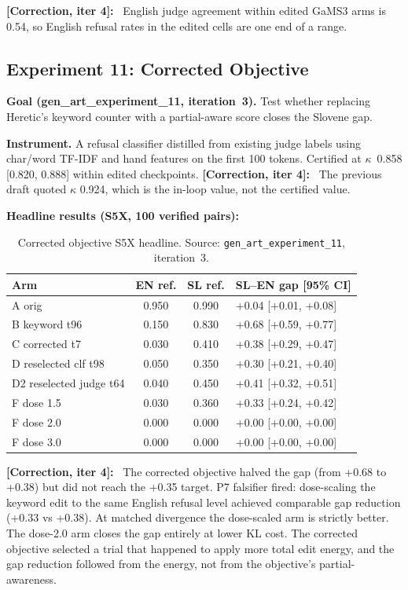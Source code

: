 \documentclass[11pt,letterpaper]{article}
\newcommand{\corr}[1]{\noindent\textbf{[Correction, iter #1]:}~}
\begin{document}
\corr{4} English judge agreement within edited GaMS3 arms is 0.54, so English refusal rates in the edited cells are one end of a range.


\subsection{Experiment 11: Corrected Objective}\label{sec:exp11}

\textbf{Goal (gen\_art\_experiment\_11, iteration~3).} Test whether replacing Heretic's keyword counter with a partial-aware score closes the Slovene gap.

\textbf{Instrument.} A refusal classifier distilled from existing judge labels using char/word TF-IDF and hand features on the first 100 tokens. Certified at $\kappa$~0.858 [0.820, 0.888] within edited checkpoints. \corr{4} The previous draft quoted $\kappa$ 0.924, which is the in-loop value, not the certified value.

\textbf{Headline results (S5X, 100 verified pairs):}

\begin{table}[!htbp]
\centering
\caption{Corrected objective S5X headline. Source: \texttt{gen\_art\_experiment\_11}, iteration~3.}
\label{tab:exp11_headline}
\small
\begin{tabular}{lccl}
\toprule
Arm & EN ref. & SL ref. & SL--EN gap [95\% CI] \\
\midrule
A orig & 0.950 & 0.990 & +0.04 [+0.01, +0.08] \\
B keyword t96 & 0.150 & 0.830 & +0.68 [+0.59, +0.77] \\
C corrected t7 & 0.030 & 0.410 & +0.38 [+0.29, +0.47] \\
D reselected clf t98 & 0.050 & 0.350 & +0.30 [+0.21, +0.40] \\
D2 reselected judge t64 & 0.040 & 0.450 & +0.41 [+0.32, +0.51] \\
F dose 1.5 & 0.030 & 0.360 & +0.33 [+0.24, +0.42] \\
F dose 2.0 & 0.000 & 0.000 & +0.00 [+0.00, +0.00] \\
F dose 3.0 & 0.000 & 0.000 & +0.00 [+0.00, +0.00] \\
\bottomrule
\end{tabular}
\end{table}

\corr{4} The corrected objective halved the gap (from +0.68 to +0.38) but did not reach the +0.35 target. P7 falsifier fired: dose-scaling the keyword edit to the same English refusal level achieved comparable gap reduction (+0.33 vs +0.38). At matched divergence the dose-scaled arm is strictly better. The dose-2.0 arm closes the gap entirely at lower KL cost. The corrected objective selected a trial that happened to apply more total edit energy, and the gap reduction followed from the energy, not from the objective's partial-awareness.
\end{document}
